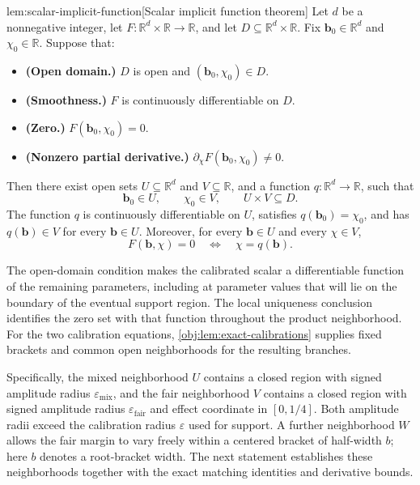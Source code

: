 \begin{lemmav}{lem:scalar-implicit-function}[Scalar implicit function theorem]
Let \(d\) be a nonnegative integer, let \(F:\mathbb R^d\times\mathbb R\to\mathbb R\), and let \(D\subseteq\mathbb R^d\times\mathbb R\). Fix \(\mathbf b_0\in\mathbb R^d\) and \(\chi_0\in\mathbb R\). Suppose that:
\begin{itemize}
\item \textbf{(Open domain.)} \(D\) is open and \((\mathbf b_0,\chi_0)\in D\).
\item \textbf{(Smoothness.)} \(F\) is continuously differentiable on \(D\).
\item \textbf{(Zero.)} \(F(\mathbf b_0,\chi_0)=0\).
\item \textbf{(Nonzero partial derivative.)} \(\partial_\chi F(\mathbf b_0,\chi_0)\ne0\).
\end{itemize}
Then there exist open sets \(U\subseteq\mathbb R^d\) and \(V\subseteq\mathbb R\), and a function \(q:\mathbb R^d\to\mathbb R\), such that
\[
\mathbf b_0\in U,\qquad \chi_0\in V,\qquad U\times V\subseteq D.
\]
The function \(q\) is continuously differentiable on \(U\), satisfies \(q(\mathbf b_0)=\chi_0\), and has \(q(\mathbf b)\in V\) for every \(\mathbf b\in U\). Moreover, for every \(\mathbf b\in U\) and every \(\chi\in V\),
\[
F(\mathbf b,\chi)=0
\quad\Longleftrightarrow\quad
\chi=q(\mathbf b).
\]
\end{lemmav}

The open-domain condition makes the calibrated scalar a differentiable function of the remaining parameters, including at parameter values that will lie on the boundary of the eventual support region. The local uniqueness conclusion identifies the zero set with that function throughout the product neighborhood. For the two calibration equations, \cref{obj:lem:exact-calibrations} supplies fixed brackets and common open neighborhoods for the resulting branches.

Specifically, the mixed neighborhood \(U\) contains a closed region with signed amplitude radius \(\varepsilon_{\mathrm{mix}}\), and the fair neighborhood \(V\) contains a closed region with signed amplitude radius \(\varepsilon_{\mathrm{fair}}\) and effect coordinate in \([0,1/4]\). Both amplitude radii exceed the calibration radius \(\varepsilon\) used for support. A further neighborhood \(W\) allows the fair margin to vary freely within a centered bracket of half-width \(b\); here \(b\) denotes a root-bracket width. The next statement establishes these neighborhoods together with the exact matching identities and derivative bounds.

